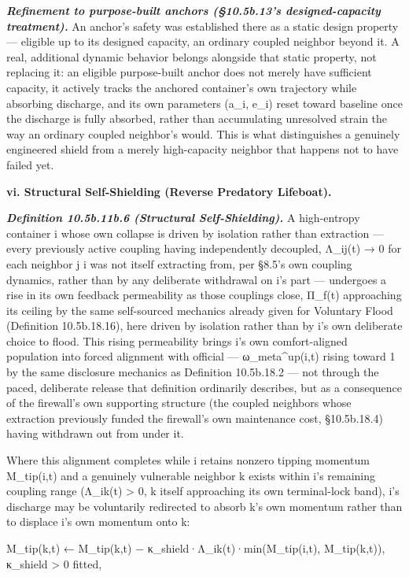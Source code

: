 \documentclass[
]{article}
\begin{document}
\emph{\textbf{Refinement to purpose-built anchors (§10.5b.13's
designed-capacity treatment).}} An anchor's safety was established there
as a static design property --- eligible up to its designed capacity, an
ordinary coupled neighbor beyond it. A real, additional dynamic behavior
belongs alongside that static property, not replacing it: an eligible
purpose-built anchor does not merely have sufficient capacity, it
actively tracks the anchored container's own trajectory while absorbing
discharge, and its own parameters (a\_i, e\_i) reset toward baseline
once the discharge is fully absorbed, rather than accumulating
unresolved strain the way an ordinary coupled neighbor's would. This is
what distinguishes a genuinely engineered shield from a merely
high-capacity neighbor that happens not to have failed yet.

\textbf{vi. Structural Self-Shielding (Reverse Predatory Lifeboat).}

\emph{\textbf{Definition 10.5b.11b.6 (Structural Self-Shielding).}} A
high-entropy container i whose own collapse is driven by isolation
rather than extraction --- every previously active coupling having
independently decoupled, Λ\_ij(t) → 0 for each neighbor j i was not
itself extracting from, per §8.5's own coupling dynamics, rather than by
any deliberate withdrawal on i's part --- undergoes a rise in its own
feedback permeability as those couplings close, Π\_f(t) approaching its
ceiling by the same self-sourced mechanics already given for Voluntary
Flood (Definition 10.5b.18.16), here driven by isolation rather than by
i's own deliberate choice to flood. This rising permeability brings i's
own comfort-aligned population into forced alignment with official ---
ω\_meta\^{}up(i,t) rising toward 1 by the same disclosure mechanics as
Definition 10.5b.18.2 --- not through the paced, deliberate release that
definition ordinarily describes, but as a consequence of the firewall's
own supporting structure (the coupled neighbors whose extraction
previously funded the firewall's own maintenance cost, §10.5b.18.4)
having withdrawn out from under it.

Where this alignment completes while i retains nonzero tipping momentum
M\_tip(i,t) and a genuinely vulnerable neighbor k exists within i's
remaining coupling range (Λ\_ik(t) \textgreater{} 0, k itself
approaching its own terminal-lock band), i's discharge may be
voluntarily redirected to absorb k's own momentum rather than to
displace i's own momentum onto k:

M\_tip(k,t) ← M\_tip(k,t) − κ\_shield·Λ\_ik(t)·min(M\_tip(i,t),
M\_tip(k,t)), κ\_shield \textgreater{} 0 fitted,
\end{document}
